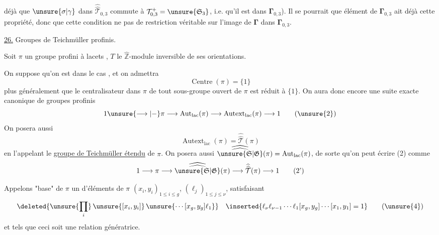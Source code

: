 

déjà que $\unsure{\sigma|\gamma}$ dans $\widehat{\widehat{\mathcal{T}}}_{0,3}$ commute à $\mathcal{T}^{+}_{0,3}=\unsure{\mathfrak{S}_{3}}$,  i.e. qu'il est dans $\boldsymbol{\Gamma}_{0,3}$). Il se pourrait que  élément de $\boldsymbol{\Gamma}_{0,3}$ ait déjà cette propriété, donc que cette condition ne  pas de restriction véritable sur l'image de $\boldsymbol{\Gamma}$ dans $\boldsymbol{\Gamma}_{0,3}$.



\uline{26.} Groupes de Teichmüller profinis.


Soit $\pi$ un groupe profini à lacets , $T$ le $\widehat{\mathbb Z}$-module inversible de ses orientations.

On suppose qu'on est dans le cas , et on admettra 
\[
\operatorname{Centre}(\pi)=\{1\}
\tag{1}
\]
plus généralement que le centralisateur dans $\pi$ de tout sous-groupe ouvert de $\pi$ est réduit à $\{1\}$. On aura donc encore une suite exacte canonique de groupes profinis
\[
1 \unsure{\longrightarrow|{-}} \pi \longrightarrow \operatorname{Aut}_{\mathrm{lac}}(\pi) \longrightarrow \operatorname{Autext}_{\mathrm{lac}}(\pi) \longrightarrow 1
\tag{\unsure{2}}
\]
On posera aussi 
\[
\operatorname{Autext}_{\mathrm{lac}}(\pi)=\widehat{\widehat{\mathcal T}}(\pi)
\tag{3}
\]
en l'appelant le \uline{groupe de Teichmüller étendu} de $\pi$. On posera aussi $\widehat{\widehat{\unsure{\mathfrak S|\mathfrak G}}}(\pi)=\operatorname{Aut}_{\mathrm{lac}}(\pi)$, de sorte qu'on peut écrire (2) comme
\[
1 \longrightarrow \pi \longrightarrow \widehat{\widehat{\unsure{\mathfrak S|\mathfrak G}}}(\pi) \longrightarrow \widehat{\widehat{\mathcal T}}(\pi) \longrightarrow 1
\tag{2'}
\]

Appelons "base" de $\pi$ un  d'éléments de $\pi$ $(x_i,y_i)_{1\leq i\leq g}$, $(\ell_j)_{1\leq j\leq\nu}$,  satisfaisant
\[
\deleted{\unsure{\prod_i}\,\unsure{[x_i,y_i]}\,\unsure{\cdots[x_g,y_g]\ell_1}}
\quad
\inserted{\ell_\nu\ell_{\nu-1}\cdots\ell_1[x_g,y_g]\cdots[x_1,y_1]=1}
\tag{\unsure{4}}
\]
et tels que ceci soit une relation génératrice.

